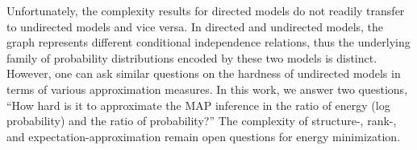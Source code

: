 
Unfortunately, the complexity results for directed models do not readily transfer to undirected models and vice versa. In directed and undirected models, the graph represents different conditional independence relations, thus the underlying family of probability distributions encoded by these two models is distinct.
However, one can ask similar questions on the hardness of undirected models in terms of various approximation measures. In this work, we answer two questions, ``How hard is it to approximate the MAP inference in the ratio of energy (log probability) and the ratio of probability?'' The complexity of structure-, rank-, and expectation-approximation remain open questions for energy minimization.





